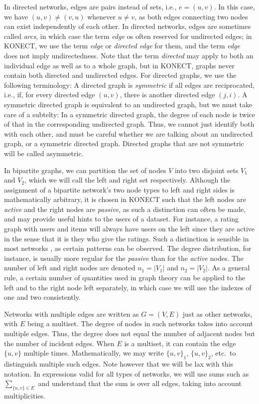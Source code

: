 \documentclass{article}
\begin{document}
In directed networks, edges are pairs instead of sets, i.e.,
$e=(u,v)$.  In this case, we have $(u,v)\neq(v,u)$ whenever $u \neq v$, 
as both edges connecting two nodes can exist independently of each
other. 
In directed networks, edges are sometimes called
\emph{arcs}, in which case the term \emph{edge} os often reserved for
undirected edges; in KONECT, we use the term \emph{edge} or \emph{directed
  edge} for them, and the term \emph{edge} does not imply
undirectedness.  Note that the term \emph{directed} may apply to both an
individual edge as well as to a whole graph, but in KONECT, graphs never
contain both directed and undirected edges.  
For directed graphs, we use the following terminology:  A directed graph
is \emph{symmetric} if all edges are reciprocated, i.e., if, for every
directed edge $(u,v)$, there is another directed edge $(j,i)$.  A
symmetric directed graph is equivalent to an undirected graph, but we
must take care of a subtelty:  In a symmetric directed graph, the degree
of each node is twice of that in the corresponding undirected graph.
Thus, we cannot just identify both with each other, and must be careful
whether we are talking about an undirected graph, or a symmetric
directed graph.  Directed graphs that are not symmetric will be called
asymmetric. 

In bipartite graphs, we can partition the set of nodes $V$ into two
disjoint sets $V_1$ and $V_2$, which we will call the left and right
set respectively.  Although the assignment of a bipartite network's two
node types to left and right sides is mathematically arbitrary, it is
chosen in KONECT such that the left nodes are \emph{active} and the
right nodes are \emph{passive}, as such a distinction can often be made,
and may provide useful hints to the users of a dataset.  For instance, a rating graph with users
and items will always have users on the left since they are active in
the sense that it is they who give the ratings. 
Such a distinction is sensible in most networks \citep{b732}, as certain
patterns can be observed.  The degree distribution, for instance, is
usually more regular for the \emph{passive} than for the \emph{active} nodes.
The number of left and
right nodes are denoted $n_1 = |V_1|$ and $n_2 = |V_2|$.  As a general
rule, a certain number of quantities used in graph theory can be applied
to the left and to the right node left separately, in which case we will
use the indexes of one and two consistently. 

Networks with multiple edges are written as $G=(V,E)$ just as other networks, with $E$ being
a multiset.  The degree of nodes in such networks takes into account
multiple edges.  Thus, the degree does not equal the number of adjacent
nodes but the number of incident edges.  When $E$ is a multiset, it can
contain the edge $\{u,v\}$ multiple times.  Mathematically, we 
may write $\{u,v\}_1$, $\{u,v\}_2$, etc.\ to distinguish multiple such
edges.   Note however that we will be lax with
this notation.  In expressions valid for all types of networks, we will
use sums such as $\sum_{\{u,v\}\in E}$ and understand that the sum
is over all edges, taking into account multiplicities. 
\end{document}

